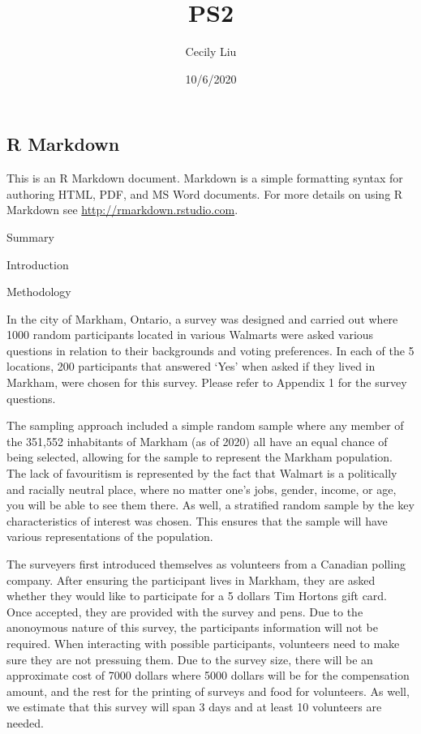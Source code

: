 \documentclass[
]{article}
\title{PS2}
\author{Cecily Liu}
\date{10/6/2020}
\begin{document}
\maketitle

\hypertarget{r-markdown}{%
\subsection{R Markdown}\label{r-markdown}}

This is an R Markdown document. Markdown is a simple formatting syntax
for authoring HTML, PDF, and MS Word documents. For more details on
using R Markdown see \url{http://rmarkdown.rstudio.com}.

Summary

Introduction

Methodology

In the city of Markham, Ontario, a survey was designed and carried out
where 1000 random participants located in various Walmarts were asked
various questions in relation to their backgrounds and voting
preferences. In each of the 5 locations, 200 participants that answered
`Yes' when asked if they lived in Markham, were chosen for this survey.
Please refer to Appendix 1 for the survey questions.

The sampling approach included a simple random sample where any member
of the 351,552 inhabitants of Markham (as of 2020) all have an equal
chance of being selected, allowing for the sample to represent the
Markham population. The lack of favouritism is represented by the fact
that Walmart is a politically and racially neutral place, where no
matter one's jobs, gender, income, or age, you will be able to see them
there. As well, a stratified random sample by the key characteristics of
interest was chosen. This ensures that the sample will have various
representations of the population.

The surveyers first introduced themselves as volunteers from a Canadian
polling company. After ensuring the participant lives in Markham, they
are asked whether they would like to participate for a 5 dollars Tim
Hortons gift card. Once accepted, they are provided with the survey and
pens. Due to the anonoymous nature of this survey, the participants
information will not be required. When interacting with possible
participants, volunteers need to make sure they are not pressuing them.
Due to the survey size, there will be an approximate cost of 7000
dollars where 5000 dollars will be for the compensation amount, and the
rest for the printing of surveys and food for volunteers. As well, we
estimate that this survey will span 3 days and at least 10 volunteers
are needed.
\end{document}
